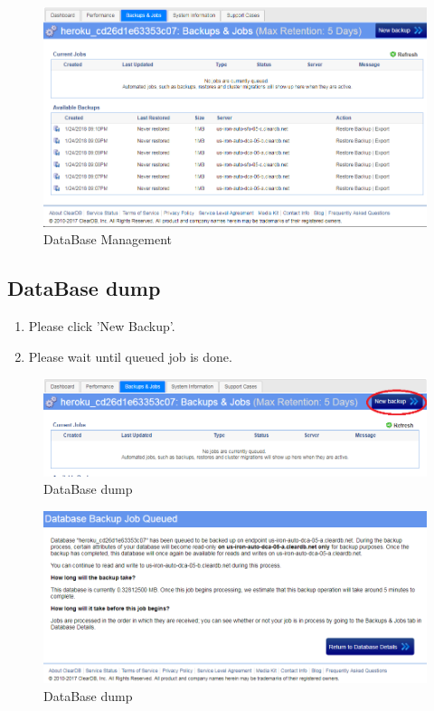 \documentclass[a4paper,11pt,twoside]{report}
\theoremstyle{definition}
\begin{document}
\thispagestyle{empty}
\begin{figure}[h!]
\begin{center}
\includegraphics[width=\textwidth]{DB/6}
\end{center}
\caption{DataBase Management}
\end{figure}
\thispagestyle{empty}


\subsection{DataBase dump} 
\begin{enumerate}
\item Please click 'New Backup'.
\item Please wait until queued job is done.
\end{enumerate}


\begin{figure}[h!]
\begin{center}
\includegraphics[width=\textwidth]{DB/7}
\end{center}
\caption{DataBase dump}
\end{figure}
\thispagestyle{empty}
\begin{figure}[h!]
\begin{center}
\includegraphics[width=\textwidth]{DB/8}
\end{center}
\caption{DataBase dump}
\end{figure}
\thispagestyle{empty}
\end{document}

